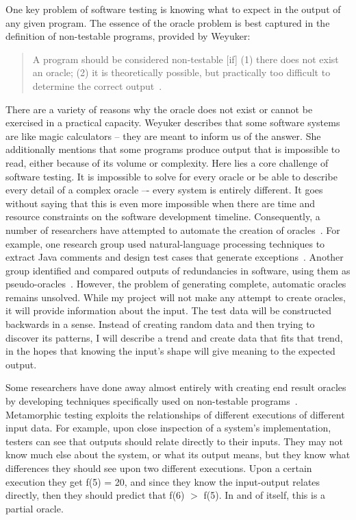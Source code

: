 One key problem of software testing is knowing what to expect in the output of any given program. The essence of the oracle problem is best captured in the definition of non-testable programs, provided by Weyuker:
\begin{quote}
A program should be considered non-testable [if] (1) there does not exist an oracle; (2) it is theoretically possible, but practically too difficult to determine the correct output~\cite{Chays:2000:FTD:347636.348954}.
\end{quote}
There are a variety of reasons why the oracle does not exist or cannot be exercised in a practical capacity. Weyuker describes that some software systems are like magic calculators -- they are meant to inform us of the answer. She additionally mentions that some programs produce output that is impossible to read, either because of its volume or complexity. Here lies a core challenge of software testing. It is impossible to solve for every oracle or be able to describe every detail of a complex oracle –- every system is entirely different. It goes without saying that this is even more impossible when there are time and resource constraints on the software development timeline. Consequently, a number of researchers have attempted to automate the creation of oracles~\cite{6963470}. For example, one research group used natural-language processing techniques to extract Java comments and design test cases that generate exceptions~\cite{Goffi:2016:AGO:2931037.2931061}. Another group identified and compared outputs of redundancies in software, using them as pseudo-oracles~\cite{Carzaniga:2014:COI:2568225.2568287}. However, the problem of generating complete, automatic oracles remains unsolved. While my project will not make any attempt to create oracles, it will provide information about the input. The test data will be constructed backwards in a sense. Instead of creating random data and then trying to discover its patterns, I will describe a trend and create data that fits that trend, in the hopes that knowing the input's shape will give meaning to the expected output.

Some researchers have done away almost entirely with creating end result oracles by developing techniques specifically used on non-testable programs~\cite{Lindvall:2017:MMT:3103620.3103632,Segura:2017:TAD:3103620.3103626,Chen:2015:MTS:2819261.2819278,Chen:2016:SOC:2970276.2970366,Lindvall:2015:MMT:2819009.2819030}. Metamorphic testing exploits the relationships of different executions of different input data. For example, upon close inspection of a system's implementation, testers can see that outputs should relate directly to their inputs. They may not know much else about the system, or what its output means, but they know what differences they should see upon two different executions. Upon a certain execution they get f(5) = 20, and since they know the input-output relates directly, then they should predict that f(6) $>$ f(5). In and of itself, this is a partial oracle.

